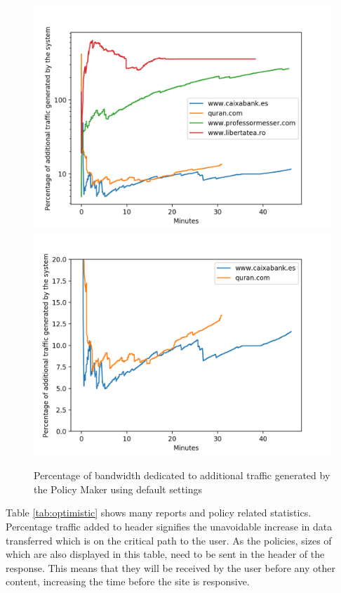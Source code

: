 \begin{figure}[H]
	\centering
	\includegraphics[width=\textwidth]{imgs/netword_usage_plot.png}
	\includegraphics[width=\textwidth]{imgs/netword_usage_long_plot.png}
	\caption{Percentage of bandwidth dedicated to additional traffic generated by the Policy Maker using default settings}
	\label{fig:standarUsage}
\end{figure}

Table \ref{tab:optimistic} shows many reports and policy related statistics.
Percentage traffic added to header signifies the unavoidable increase in data transferred which is on the critical path to the user.
As the policies, sizes of which are also displayed in this table, need to be sent in the header of the response.
This means that they will be received by the user before any other content, increasing the time before the site is responsive.

